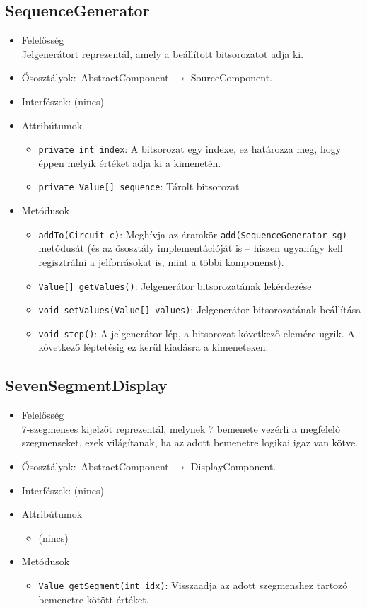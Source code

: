 \subsection{SequenceGenerator}
\begin{itemize}
\item Felelősség\\
Jelgenerátort reprezentál, amely a beállított bitsorozatot adja ki.
\item Ősosztályok:\ AbstractComponent $\rightarrow{}$ SourceComponent.
\item Interfészek: (nincs)
\item Attribútumok $\ $
\begin{itemize}
	\item \texttt{private int index}: A bitsorozat egy indexe, ez határozza meg, hogy éppen melyik értéket adja ki a kimenetén.
	\item \texttt{private Value[] sequence}: Tárolt bitsorozat
\end{itemize}
\item Metódusok$\ $
\begin{itemize}
\item \texttt{addTo(Circuit c)}: Meghívja az áramkör \texttt{add(SequenceGenerator sg)} metódusát (és az ősosztály implementációját is -- hiszen ugyanúgy kell regisztrálni a jelforrásokat is, mint a többi komponenst).
	\item \texttt{Value[] getValues()}: Jelgenerátor bitsorozatának lekérdezése
	\item \texttt{void setValues(Value[] values)}: Jelgenerátor bitsorozatának beállítása
	\item \texttt{void step()}: A jelgenerátor lép, a bitsorozat következő elemére ugrik. A következő léptetésig ez kerül kiadásra a kimeneteken.
\end{itemize}
\end{itemize}

\subsection{SevenSegmentDisplay}
\begin{itemize}
\item Felelősség\\
7-szegmenses kijelzőt reprezentál, melynek 7 bemenete vezérli a  megfelelő szegmenseket, ezek világítanak, ha az adott bemenetre logikai igaz van kötve.
\item Ősosztályok:\ AbstractComponent $\rightarrow{}$ DisplayComponent.
\item Interfészek: (nincs)
\item Attribútumok $\ $
\begin{itemize}
\item (nincs)
\end{itemize}
\item Metódusok$\ $
\begin{itemize}
	\item \texttt{Value getSegment(int idx)}: Visszaadja az adott szegmenshez tartozó bemenetre kötött értéket.
\end{itemize}
\end{itemize}

